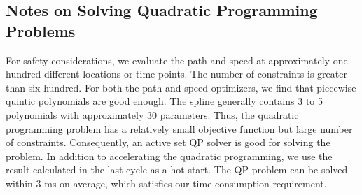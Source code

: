 \documentclass{report}
\begin{document}
\subsection{Notes on Solving Quadratic Programming Problems}
For safety considerations, we evaluate the path and speed at approximately one-hundred different locations or time points. The number of constraints is greater than six hundred. For both the path and speed optimizers, we find that piecewise quintic polynomials are good enough. The spline generally contains 3 to 5 polynomials with approximately 30 parameters. Thus, the quadratic programming problem has a relatively small objective function but large number of constraints. Consequently, an active set QP solver is good for solving the problem. In addition to accelerating the quadratic programming, we use the result calculated in the last cycle as a hot start. The QP problem can be solved within 3 ms on average, which satisfies our time consumption requirement.
\end{document}
